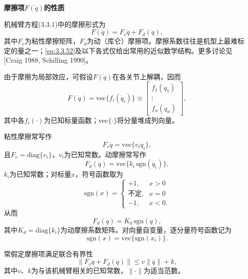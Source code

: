\documentclass[12pt,a4paper]{ctexart}
\begin{document}
\textbf{摩擦项$F(\dot{q})$的性质}

机械臂方程(3.3.1)中的摩擦形式为
\begin{equation}\label{eq:3.3.52}
F(\dot{q}) = F_v\dot{q} + F_d(\dot{q}),
\end{equation}
其中$F_v$为粘性摩擦矩阵，$F_d$为动（库仑）摩擦项。摩擦系数往往是机型上最难标定的量之一；\eqref{eq:3.3.52}及以下各式仅给出常用的近似数学结构。更多讨论见[Craig 1988, Schilling 1990]。

由于摩擦为局部效应，可假设$F(\dot{q})$在各关节上解耦，因而
\begin{equation}\label{eq:3.3.53}
F(\dot{q}) = \mathrm{vec}\{f_i(\dot{q}_i)\} \equiv \begin{bmatrix} f_1(\dot{q}_1) \\ \vdots \\ f_n(\dot{q}_n) \end{bmatrix},
\end{equation}
其中各$f_i(\cdot)$为已知标量函数；$\mathrm{vec}\{\cdot\}$将分量堆成列向量。

粘性摩擦常写作
\begin{equation}\label{eq:3.3.54}
F_v\dot{q} = \mathrm{vec}\{v_i\dot{q}_i\},
\end{equation}
且$F_v=\mathrm{diag}\{v_i\}$，$v_i$为已知常数。动摩擦常写作
\begin{equation}\label{eq:3.3.55}
F_d(\dot{q}) = \mathrm{vec}\{k_i\,\mathrm{sgn}(\dot{q}_i)\},
\end{equation}
$k_i$为已知常数；对标量$x$，符号函数取为
\begin{equation}\label{eq:3.3.56}
\mathrm{sgn}(x) = \begin{cases} +1, & x > 0 \\ \text{不定}, & x = 0 \\ -1, & x < 0. \end{cases}
\end{equation}
从而
\begin{equation}\label{eq:3.3.57}
F_d(\dot{q}) = K_d\,\mathrm{sgn}(\dot{q}),
\end{equation}
其中$K_d=\mathrm{diag}\{k_i\}$为动摩擦系数矩阵。对向量自变量，逐分量符号函数记为
\begin{equation}\label{eq:3.3.58}
\mathrm{sgn}(x) = \mathrm{vec}\{\mathrm{sgn}(x_i)\}.
\end{equation}

常假定摩擦项满足联合有界性
\begin{equation}\label{eq:3.3.59}
\|F_v\dot{q} + F_d(\dot{q})\| \leq v\|\dot{q}\| + k,
\end{equation}
其中$v$、$k$为与该机械臂相关的已知常数，$\|\cdot\|$为适当范数。
\end{document}
